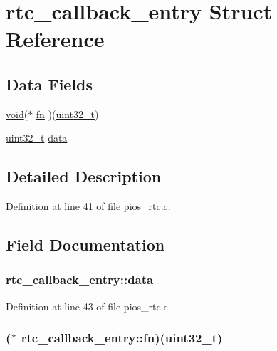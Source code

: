 \hypertarget{structrtc__callback__entry}{\section{rtc\-\_\-callback\-\_\-entry Struct Reference}
\label{structrtc__callback__entry}
}
\subsection*{Data Fields}
\begin{DoxyCompactItemize}
\item 
\hyperlink{group___n_a_m_e_ga18028b8badbf1ea7e704ccac3c488e82}{void}($\ast$ \hyperlink{structrtc__callback__entry_a7ca379756b7000535a88945227737a87}{fn} )(\hyperlink{stdint_8h_a435d1572bf3f880d55459d9805097f62}{uint32\-\_\-t})
\item 
\hyperlink{stdint_8h_a435d1572bf3f880d55459d9805097f62}{uint32\-\_\-t} \hyperlink{structrtc__callback__entry_ac2c725fd2cfc8a02ab9c7427f9107d5a}{data}
\end{DoxyCompactItemize}


\subsection{Detailed Description}


Definition at line 41 of file pios\-\_\-rtc.\-c.



\subsection{Field Documentation}
\hypertarget{structrtc__callback__entry_ac2c725fd2cfc8a02ab9c7427f9107d5a}{
\subsubsection[{data}]{ rtc\-\_\-callback\-\_\-entry\-::data}}\label{structrtc__callback__entry_ac2c725fd2cfc8a02ab9c7427f9107d5a}


Definition at line 43 of file pios\-\_\-rtc.\-c.

\hypertarget{structrtc__callback__entry_a7ca379756b7000535a88945227737a87}{
\subsubsection[{fn}]{($\ast$ rtc\-\_\-callback\-\_\-entry\-::fn)({\bf uint32\-\_\-t})}}\label{structrtc__callback__entry_a7ca379756b7000535a88945227737a87}


